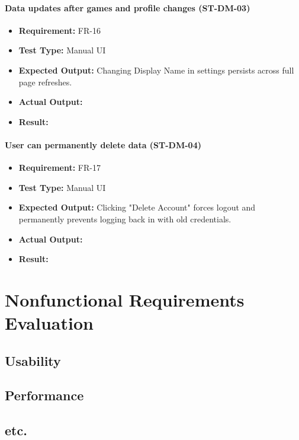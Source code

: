 \documentclass[12pt, titlepage]{article}
\begin{document}
\paragraph{Data updates after games and profile changes (ST-DM-03)}
\begin{itemize}
  \item \textbf{Requirement:} FR-16
  \item \textbf{Test Type:} Manual UI
  \item \textbf{Expected Output:} Changing Display Name in settings persists across full page refreshes.
  \item \textbf{Actual Output:} 
  \item \textbf{Result:} 
\end{itemize}

\paragraph{User can permanently delete data (ST-DM-04)}
\begin{itemize}
  \item \textbf{Requirement:} FR-17
  \item \textbf{Test Type:} Manual UI
  \item \textbf{Expected Output:} Clicking "Delete Account" forces logout and permanently prevents logging back in with old credentials.
  \item \textbf{Actual Output:} 
  \item \textbf{Result:} 
\end{itemize}

\section{Nonfunctional Requirements Evaluation}

\subsection{Usability}
		
\subsection{Performance}

\subsection{etc.}
	
\end{document}
